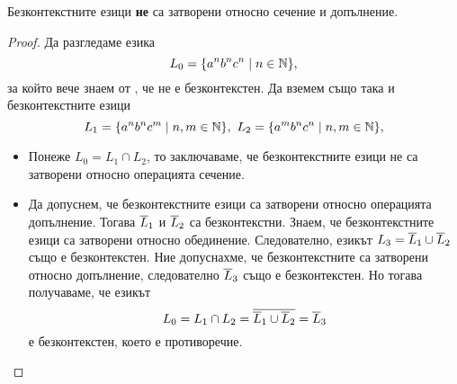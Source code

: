 \begin{thm}
  Безконтекстните езици {\bf не} са затворени относно сечение и допълнение.
\end{thm}
\begin{proof}
  Да разгледаме езика
  \[L_0 = \{a^nb^nc^n\mid n\in\mathbb{N}\},\] за който вече знаем от , че не е безконтекстен.
  Да вземем също така и безконтекстните езици 
  \[L_1 = \{a^nb^nc^m\mid n,m\in\mathbb{N}\},\ L_2 = \{a^mb^nc^n\mid n,m\in\mathbb{N}\},\]
  \begin{itemize}
  \item 
    Понеже $L_0 = L_1\cap L_2$, то заключаваме, че безконтекстните езици не са затворени 
    относно операцията сечение.
  \item
    Да допуснем, че безконтекстните езици са затворени относно операцията допълнение.
    Тогава  $\overline{L}_1$ и $\overline{L}_2$ са безконтекстни.
    Знаем, че безконтекстните езици са затворени относно обединение. 
    Следователно, езикът $L_3 = \overline{L}_1 \cup \overline{L}_2$ също е безконтекстен.
    Ние допуснахме, че безконтекстните са затворени относно допълнение, следователно $\overline{L}_3$
    също е безконтекстен.
    Но тогава получаваме, че езикът
    \[L_0 = L_1 \cap L_2 = \overline{\overline{L}_1 \cup \overline{L}_2} = \overline{L}_3\]
    е безконтекстен, което е противоречие.
  \end{itemize}
\end{proof}


